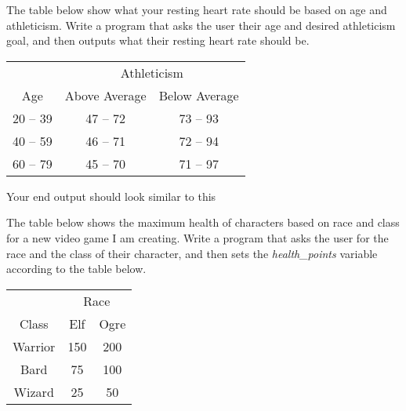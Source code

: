 


	\item  
		The table below show what your resting heart rate should be based on age and athleticism.  
		Write a program that asks the user their age and desired athleticism goal, and then outputs 
		what their resting heart rate should be.

		\begin{minipage}{.45\textwidth}
			\begin{tabular}{c|cc}
				& \multicolumn{2}{c}{Athleticism}\\
				Age & Above Average & Below Average \\ \hline
				20 -- 39 & 47 -- 72 & 73 -- 93\\
				40 -- 59 & 46 -- 71 & 72 -- 94\\
				60 -- 79 & 45 -- 70 & 71 -- 97 \\
			\end{tabular}
		\end{minipage}
		\begin{minipage}{.45\textwidth}
			\vspace*{1em}
			Your end output should look similar to this
		\end{minipage}





	\item  
		The table below shows the maximum health of characters based on race and class for a new 
		video game I am creating.  Write a program that asks the user for the race and the class of 
		their character, and then sets the \textit{health\_points}	variable according to the table 
		below.
		\begin{flushright}
		\begin{tabular}{c|cc}
			& \multicolumn{2}{c}{Race}\\
			Class & Elf & Ogre \\ \hline
			Warrior & 150 & 200\\
			Bard & 75 & 100\\
			Wizard & 25 & 50 \\
		\end{tabular}
		\end{flushright}
		

